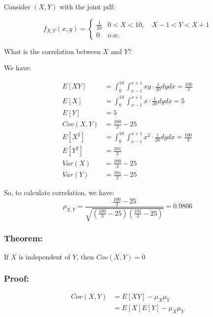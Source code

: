 \documentclass{article}
\begin{document}
Consider $(X,Y)$ with the joint pdf:

\begin{equation*}
    f_{X,Y}(x,y) = \begin{cases}
        \frac{1}{20} & 0 < X < 10, \quad X-1 < Y < X+1 \\
        0 & o.w.
    \end{cases}
\end{equation*}

What is the correlation between $X$ and $Y$?

We have:

\begin{equation*}
\begin{split}
    E[XY] &= \int_0^{10}\int_{x-1}^{x+1} xy \cdot \frac{1}{20} dy dx = \frac{100}{3}\\
    E[X] &= \int_0^{10}\int_{x-1}^{x+1} x \cdot \frac{1}{20} dy dx = 5\\
    E[Y] &= 5\\
    Cov(X,Y) &= \frac{100}{3}-25\\
    E[X^2] &= \int_0^{10}\int_{x-1}^{x+1} x^2 \cdot \frac{1}{20} dy dx = \frac{100}{3}\\
    E[Y^2] &= \frac{101}{3}\\
    Var(X) &= \frac{100}{3}-25\\
    Var(Y) &= \frac{101}{3}-25
\end{split}
\end{equation*}

So, to calculate correlation, we have:
\begin{equation*}
    \rho_{X,Y} = \frac{\frac{100}{3} - 25}{\sqrt{\left(\frac{100}{3}-25 \right)\left( \frac{101}{3}-25 \right) }} = 0.9806
\end{equation*}

\subsubsection*{Theorem:}
If $X$ is independent of $Y$, then $Cov(X,Y) = 0$

\subsubsection*{Proof:}
\begin{equation*}
    \begin{split}
        Cov(X,Y) &= E[XY] - \mu_X \mu_Y\\
            &= E[X]E[Y] - \mu_X \mu_Y
    \end{split}
\end{equation*}
\end{document}
